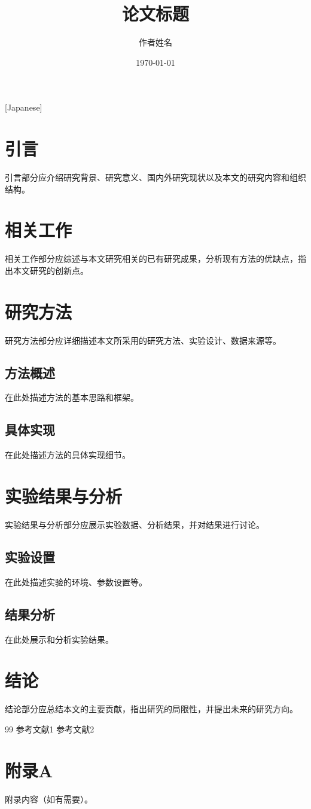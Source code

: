 [Japanese] \documentclass[12pt,a4paper,twocolumn]{article}
\title{论文标题}
\author{作者姓名}
\date{\today}
\begin{document}

\section{引言}
引言部分应介绍研究背景、研究意义、国内外研究现状以及本文的研究内容和组织结构。

\section{相关工作}
相关工作部分应综述与本文研究相关的已有研究成果，分析现有方法的优缺点，指出本文研究的创新点。

\section{研究方法}
研究方法部分应详细描述本文所采用的研究方法、实验设计、数据来源等。

\subsection{方法概述}
在此处描述方法的基本思路和框架。

\subsection{具体实现}
在此处描述方法的具体实现细节。

\section{实验结果与分析}
实验结果与分析部分应展示实验数据、分析结果，并对结果进行讨论。

\subsection{实验设置}
在此处描述实验的环境、参数设置等。

\subsection{结果分析}
在此处展示和分析实验结果。

\section{结论}
结论部分应总结本文的主要贡献，指出研究的局限性，并提出未来的研究方向。

\begin{thebibliography}{99}
 参考文献1
 参考文献2
\end{thebibliography}

\appendix
\section{附录A}
附录内容（如有需要）。
\end{document}
